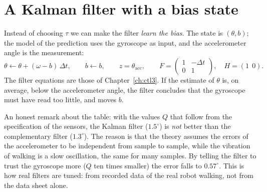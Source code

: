 \section*{A Kalman filter with a bias state}
Instead of choosing $\tau$ we can make the filter \emph{learn the bias}. The state is $(\theta,b)$; the model of the prediction uses the gyroscope as input, and the accelerometer angle is the measurement:
\[
\theta\leftarrow\theta+(\omega-b)\,\Delta t,\qquad b\leftarrow b,\qquad z=\theta_{\text{acc}},\qquad
F=\begin{pmatrix}1&-\Delta t\\0&1\end{pmatrix},\quad H=(1\ \ 0).
\]
The filter equations are those of Chapter~\ref{ch:ctl3}. If the estimate of $\theta$ is, on average, below the accelerometer angle, the filter concludes that the gyroscope must have read too little, and moves $b$.

\begin{center}
\end{center}

An honest remark about the table: with the values $Q$ that follow from the specification of the sensors, the Kalman filter ($1.5^{\circ}$) is \emph{not} better than the complementary filter ($1.3^{\circ}$). The reason is that the theory assumes the errors of the accelerometer to be independent from sample to sample, while the vibration of walking is a slow oscillation, the same for many samples. By telling the filter to trust the gyroscope more ($Q$ ten times smaller) the error falls to $0.57^{\circ}$. This is how real filters are tuned: from recorded data of the real robot walking, not from the data sheet alone.

